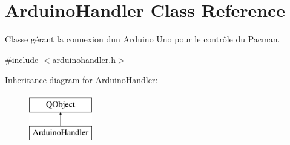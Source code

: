 \hypertarget{class_arduino_handler}{}\section{Arduino\+Handler Class Reference}
\label{class_arduino_handler}


Classe gérant la connexion d\textquotesingle{}un Arduino Uno pour le contrôle du Pacman.  




{\ttfamily \#include $<$arduinohandler.\+h$>$}

Inheritance diagram for Arduino\+Handler\+:\begin{figure}[H]
\begin{center}
\leavevmode
\includegraphics[height=2.000000cm]{class_arduino_handler}
\end{center}
\end{figure}

